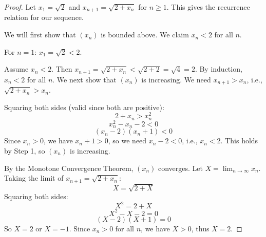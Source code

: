\documentclass[12pt]{article}
\begin{document}
\begin{proof}
Let $x_1 = \sqrt{2}$ and $x_{n+1} = \sqrt{2 + x_n}$ for $n \geq 1$. This gives the recurrence relation for our sequence.

We will first show that $(x_n)$ is bounded above. We claim $x_n < 2$ for all $n$. 

For $n = 1$: $x_1 = \sqrt{2} < 2$. 

Assume $x_n < 2$. Then $x_{n+1} = \sqrt{2 + x_n} < \sqrt{2 + 2} = \sqrt{4} = 2$. By induction, $x_n < 2$ for all $n$.
We next show that $(x_n)$ is increasing. We need $x_{n+1} > x_n$, i.e., $\sqrt{2 + x_n} > x_n$.

Squaring both sides (valid since both are positive):
$$2 + x_n > x_n^2$$
$$x_n^2 - x_n - 2 < 0$$
$$(x_n - 2)(x_n + 1) < 0$$
Since $x_n > 0$, we have $x_n + 1 > 0$, so we need $x_n - 2 < 0$, i.e., $x_n < 2$. This holds by Step 1, so $(x_n)$ is increasing.

By the Monotone Convergence Theorem, $(x_n)$ converges. Let $X = \lim_{n\to\infty} x_n$.
Taking the limit of $x_{n+1} = \sqrt{2 + x_n}$:
$$X = \sqrt{2 + X}$$
Squaring both sides:
$$X^2 = 2 + X$$
$$X^2 - X - 2 = 0$$
$$(X-2)(X+1) = 0$$
So $X = 2$ or $X = -1$. Since $x_n > 0$ for all $n$, we have $X > 0$, thus $X = 2$.
\end{proof}
\end{document}

